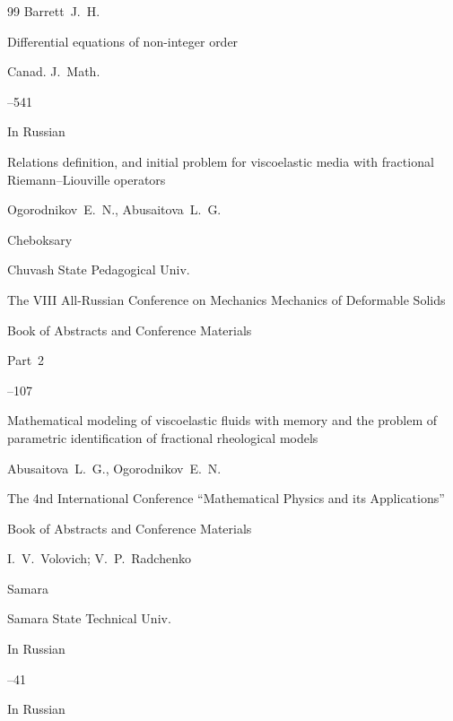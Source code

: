 \begin{thebibliography}{99}
\by Barrett~J.~H.

\paper Differential equations of non-integer order 

\jour  Canad. J.~Math.



--541






\lang In Russian

\paper Relations definition, and initial problem for viscoelastic media with fractional Riemann--Liouville operators

\by Ogorodnikov~E.~N., Abusaitova~L.~G.

\publaddr Cheboksary

\publ Chuvash State Pedagogical Univ.

\inbook The VIII All-Russian Conference on Mechanics Mechanics of Deformable Solids

\bookinfo Book of Abstracts and Conference Materials


\issueinfo Part~2

--107




\paper Mathematical modeling of viscoelastic fluids with memory and the problem of parametric identification of fractional rheological models

\by Abusaitova~L.~G., Ogorodnikov~E.~N.

\inbook  The 4nd International Conference ``Mathematical Physics and its Applications''

\bookinfo Book of Abstracts and Conference Materials

\eds I.~V.~Volovich; V.~P.~Radchenko

\publaddr Samara

\publ Samara State Technical Univ.


\lang In Russian

--41




\lang In Russian


\end{thebibliography}

